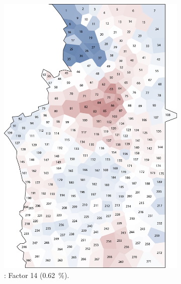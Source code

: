 \documentclass[output=paper]{LSP/langsci}
\begin{document}
\begin{figure}
\begin{subfigure}[t]{0.3\textwidth}
\includegraphics[width=\textwidth]{illustrations/pickl_fig16}
\caption{: Factor 14 (0.62~\%).}
\label{fig:16}
\end{subfigure}  
~
\begin{subfigure}[t]{0.3\textwidth}

\end{subfigure}
\end{figure}
\end{document}
